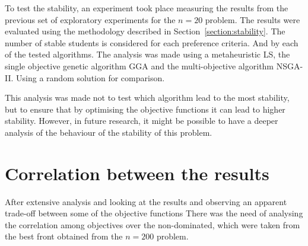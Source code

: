 To test the stability, an experiment took place measuring the results from the previous set of exploratory experiments for the $n=20$ problem. The results were evaluated using the methodology described in Section~\ref{section:stability}. The number of stable students is considered for each preference criteria. And by each of the tested algorithms. The analysis was made using a metaheuristic LS, the single objective genetic algorithm GGA and the multi-objective algorithm NSGA-II. Using a random solution for comparison.\\

\par
\begin{table}[H]
\centering
{}
\caption{Number of stable students in the groups by preference criteria}
\label{tab:preference_criteria}
\end{table}

This analysis was made not to test which algorithm lead to the most stability, but to ensure that by optimising the objective functions it can lead to higher stability. However, in future research, it might be possible to have a deeper analysis of the behaviour of the stability of this problem.
    
\section{Correlation between the results}

After extensive analysis and looking at the results and observing an apparent trade-off between some of the objective functions There was the need of analysing the correlation among objectives over the non-dominated, which were taken from the best front obtained from the $n=200$ problem.\\

